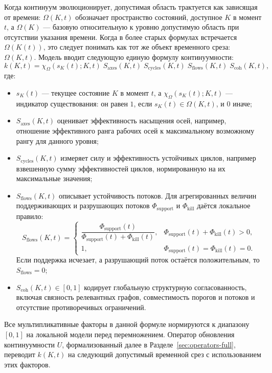 Когда континуум эволюционирует, допустимая область трактуется как зависящая от
времени:
\(\Omega(K,t)\) обозначает пространство состояний, доступное \(K\) в момент \(t\),
а \(\Omega(K)\) — базовую относительную к уровню допустимую область при отсутствии указания
времени.
Когда в более старых формулах встречается \(\Omega(K(t))\), это следует понимать как тот же
объект временного среза: \(\Omega(K,t)\).
Модель вводит следующую единую формулу континуумности:
\[
    k(K,t)
    = \chi_{\Omega}(s_K(t);K,t)\;
      S_{\mathrm{axes}}(K,t)\;
      S_{\mathrm{cycles}}(K,t)\;
      S_{\mathrm{flows}}(K,t)\;
      S_{\mathrm{coh}}(K,t),
\]
где:
\begin{itemize}
    \item \(s_K(t)\) — текущее состояние \(K\) в момент \(t\), а
          \(\chi_{\Omega}(s_K(t);K,t)\) — индикатор существования:
          он равен \(1\), если \(s_K(t)\in\Omega(K,t)\), и \(0\) иначе;
    \item \(S_{\mathrm{axes}}(K,t)\) оценивает эффективность насыщения осей, например,
          отношение эффективного ранга рабочих осей к максимальному возможному рангу для данного уровня;
    \item \(S_{\mathrm{cycles}}(K,t)\) измеряет силу и эффективность устойчивых циклов,
          например взвешенную сумму эффективностей циклов, нормированную на их максимальные значения;
    \item \(S_{\mathrm{flows}}(K,t)\) описывает устойчивость потоков. Для агрегированных
          величин поддерживающих и разрушающих потоков
          \(\Phi_{\mathrm{support}}\) и \(\Phi_{\mathrm{kill}}\) даётся локальное правило:
          \[
              S_{\mathrm{flows}}(K,t)=
              \begin{cases}
              \dfrac{\Phi_{\mathrm{support}}(t)}
                    {\Phi_{\mathrm{support}}(t)+\Phi_{\mathrm{kill}}(t)},
                    & \Phi_{\mathrm{support}}(t)+\Phi_{\mathrm{kill}}(t)>0,\\[0.7em]
              1, & \Phi_{\mathrm{support}}(t)=\Phi_{\mathrm{kill}}(t)=0.
              \end{cases}
          \]
          Если поддержка исчезает, а разрушающий поток остаётся положительным, то
          \(S_{\mathrm{flows}}=0\);
    \item \(S_{\mathrm{coh}}(K,t)\in[0,1]\) кодирует глобальную структурную согласованность,
          включая связность релевантных графов, совместимость порогов и потоков и отсутствие
          противоречивых ограничений.
\end{itemize}
Все мультипликативные факторы в данной формуле нормируются к диапазону \([0,1]\) на локальной модели
перед перемножением.
Оператор обновления континуумности \(U\), формализованный далее в Разделе~\ref{sec:operators-full},
переводит \(k(K,t)\) на следующий допустимый временной срез с использованием этих факторов.

